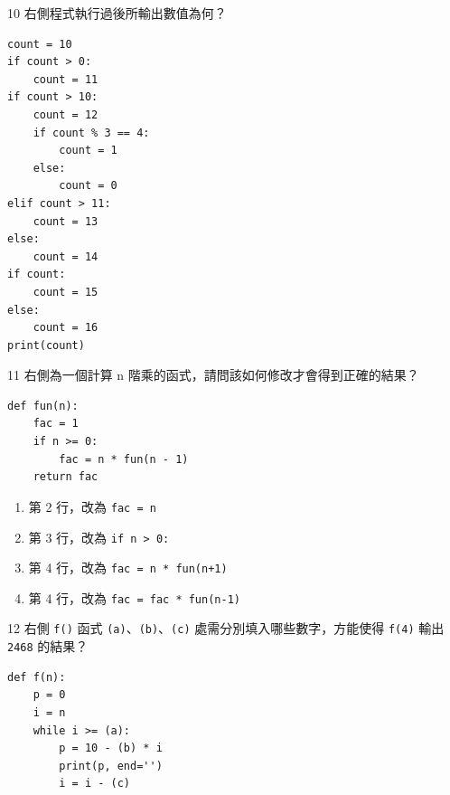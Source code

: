 \medskip

\begin{qbox}{10}
右側程式執行過後所輸出數值為何？

\begin{verbatim}
count = 10
if count > 0:
    count = 11
if count > 10:
    count = 12
    if count % 3 == 4:
        count = 1
    else:
        count = 0
elif count > 11:
    count = 13
else:
    count = 14
if count:
    count = 15
else:
    count = 16
print(count)
\end{verbatim}

\end{qbox}

\medskip

\begin{qbox}{11}
右側為一個計算 n 階乘的函式，請問該如何修改才會得到正確的結果？

\begin{verbatim}
def fun(n):
    fac = 1
    if n >= 0:
        fac = n * fun(n - 1)
    return fac
\end{verbatim}

\begin{enumerate}[label=(\Alph*), itemsep=1pt, topsep=1pt, leftmargin=2.2em, parsep=0pt]
  \item 第 2 行，改為 \texttt{fac = n}
  \item 第 3 行，改為 \texttt{if n > 0:}
  \item 第 4 行，改為 \texttt{fac = n * fun(n+1)}
  \item 第 4 行，改為 \texttt{fac = fac * fun(n-1)}
\end{enumerate}
\end{qbox}

\medskip

\begin{qbox}{12}
右側 \texttt{f()} 函式 \texttt{(a)}、\texttt{(b)}、\texttt{(c)} 處需分別填入哪些數字，方能使得 \texttt{f(4)} 輸出 \texttt{2468} 的結果？

\begin{verbatim}
def f(n):
    p = 0
    i = n
    while i >= (a):
        p = 10 - (b) * i
        print(p, end='')
        i = i - (c)
\end{verbatim}

\end{qbox}

